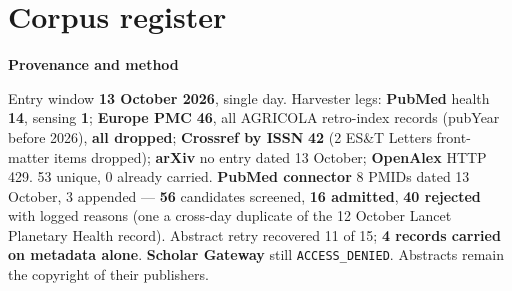 \documentclass[10pt]{article}
\begin{document}
\clearpage
\section*{\sffamily\bfseries\color{Deep}Corpus register}
\vspace{-1.5mm}{\color{Amber}\rule{\linewidth}{1.1pt}}\vspace{2.5mm}



\vspace{2mm}

\begin{keybox}
{\sffamily\bfseries\footnotesize\color{Deep}Provenance and method}\\[1.2mm]
{\fontsize{7.2}{8.8}\selectfont
Entry window \textbf{13 October 2026}, single day. Harvester legs: \textbf{PubMed} health \textbf{14},
sensing \textbf{1}; \textbf{Europe PMC} \textbf{46}, all AGRICOLA retro-index records (pubYear before 2026),
\textbf{all dropped}; \textbf{Crossref by ISSN} \textbf{42} (2 ES\&T Letters front-matter items dropped);
\textbf{arXiv} no entry dated 13 October; \textbf{OpenAlex} HTTP 429. 53 unique, 0 already carried.
\textbf{PubMed connector} 8 PMIDs dated 13 October, 3 appended --- \textbf{56} candidates screened,
\textbf{16 admitted}, \textbf{40 rejected} with logged reasons (one a cross-day duplicate of the 12 October
Lancet Planetary Health record). Abstract retry recovered 11 of 15; \textbf{4 records carried on metadata
alone}. \textbf{Scholar Gateway} still \texttt{ACCESS\_DENIED}. Abstracts remain the copyright of their
publishers.\par}
\end{keybox}
\end{document}
